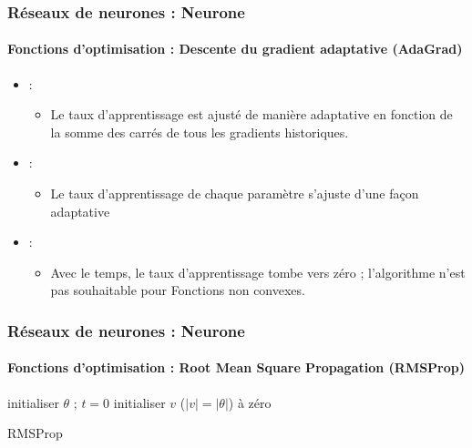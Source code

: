 \documentclass[xcolor=table]{beamer}
\begin{document}
\begin{frame}
\frametitle{Réseaux de neurones : Neurone}
\framesubtitle{Fonctions d'optimisation : Descente du gradient adaptative (AdaGrad)}

\begin{itemize}
	\item {} : 
	\begin{itemize}
		\item Le taux d'apprentissage est ajusté de manière adaptative en fonction de la somme des carrés de tous les gradients historiques.
	\end{itemize}
	\item {} : 
	\begin{itemize}
		\item Le taux d'apprentissage de chaque paramètre s'ajuste d'une façon adaptative
	\end{itemize}
	\item {} : 
	\begin{itemize}
		\item Avec le temps, le taux d'apprentissage tombe vers zéro ; l'algorithme n'est pas souhaitable pour Fonctions non convexes.
	\end{itemize}
\end{itemize}

\end{frame}

\begin{frame}
\frametitle{Réseaux de neurones : Neurone}
\framesubtitle{Fonctions d'optimisation : Root Mean Square Propagation (RMSProp)}

\begin{algorithm}[H]
	\KwResult{$ \theta $}
	initialiser $ \theta $ ; $ t = 0 $\;
	initialiser $v$ ($|v| = |\theta|$) à zéro\;
	\caption{RMSProp}
\end{algorithm}

\end{frame}
\end{document}
